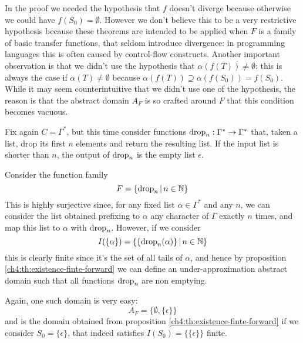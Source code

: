 In the proof we needed the hypothesis that $f$ doesn't diverge because otherwise we could have $f(S_0) = \emptyset$. However we don't believe this to be a very restrictive hypothesis because these theorems are intended to be applied when $F$ is a family of basic transfer functions, that seldom introduce divergence: in programming languages this is often caused by control-flow constructs.
Another important observation is that we didn't use the hypothesis that $\alpha(f(T)) \neq \emptyset$: this is always the case if $\alpha(T) \neq \emptyset$ because $\alpha(f(T)) \supseteq \alpha(f(S_0)) = f(S_0)$. While it may seem counterintuitive that we didn't use one of the hypothesis, the reason is that the abstract domain $A_F$ is so crafted around $F$ that this condition becomes vacuous.

\begin{example}
	Fix again $C = \Gamma^{*}$, but this time consider functions $\text{drop}_n : \Gamma^* \rightarrow \Gamma^*$ that, taken a list, drop its first $n$ elements and return the resulting list. If the input list is shorter than $n$, the output of $\text{drop}_n$ is the empty list $\epsilon$.

	Consider the function family
	\[
	F = \{ \text{drop}_n \,\vert\, n \in \mathbb{N} \}
	\]
	This is highly surjective since, for any fixed list $\alpha \in \Gamma^*$ and any $n$, we can consider the list obtained prefixing to $\alpha$ any character of $\Gamma$ exactly $n$ times, and map this list to $\alpha$ with $\text{drop}_n$.
	However, if we consider
	\[
	I(\{ \alpha \}) = \{ \{ \text{drop}_n(\alpha) \} \,\vert\, n \in \mathbb{N} \}
	\]
	this is clearly finite since it's the set of all tails of $\alpha$, and hence by proposition \ref{ch4:th:existence-finte-forward} we can define an under-approximation abstract domain such that all functions $\text{drop}_n$ are non emptying.

	Again, one such domain is very easy:
	\[
	A_F = \{ \emptyset, \{ \epsilon \} \}
	\]
	and is the domain obtained from proposition \ref{ch4:th:existence-finte-forward} if we consider $S_0 = \{ \epsilon \}$, that indeed satisfies $I(S_0) = \{ \{ \epsilon \} \}$ finite.
\end{example}

